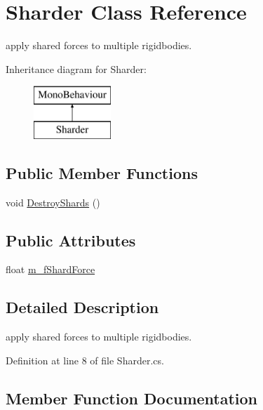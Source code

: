 \hypertarget{class_sharder}{}\section{Sharder Class Reference}
\label{class_sharder}


apply shared forces to multiple rigidbodies.  


Inheritance diagram for Sharder\+:\begin{figure}[H]
\begin{center}
\leavevmode
\includegraphics[height=2.000000cm]{class_sharder}
\end{center}
\end{figure}
\subsection*{Public Member Functions}
\begin{DoxyCompactItemize}
\item 
void \mbox{\hyperlink{class_sharder_ad511877259cbbebc4387e36a29b47a87}{Destroy\+Shards}} ()
\end{DoxyCompactItemize}
\subsection*{Public Attributes}
\begin{DoxyCompactItemize}
\item 
float \mbox{\hyperlink{class_sharder_a16b103fe97c9f41f5a3ac00a7d2f2f14}{m\+\_\+f\+Shard\+Force}}
\end{DoxyCompactItemize}


\subsection{Detailed Description}
apply shared forces to multiple rigidbodies. 



Definition at line 8 of file Sharder.\+cs.



\subsection{Member Function Documentation}
\mbox{\label{class_sharder_ad511877259cbbebc4387e36a29b47a87}} 
